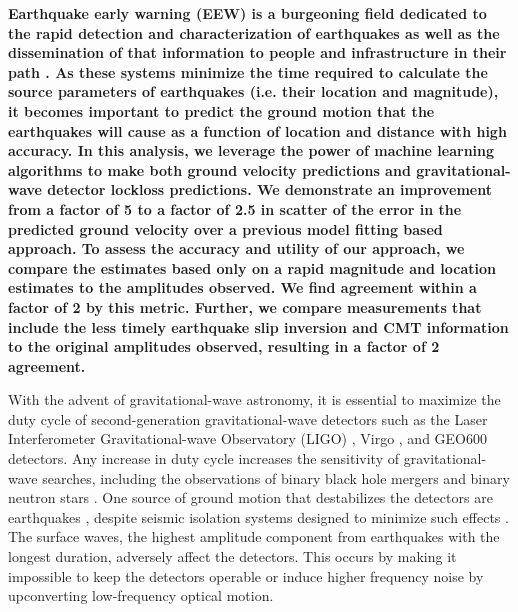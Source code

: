 \documentclass[preprint, aps, showpacs]{revtex4-1}
\begin{document}
\author{Hugh Radkins}

\author{Bas Swinkels}

\author{Keith Thorne}

\author{Jim Warner}

\maketitle

\textbf{Earthquake early warning (EEW) is a burgeoning field dedicated to the rapid detection and characterization of earthquakes as well as the dissemination of that information to people and infrastructure in their path \cite{Al2012,KuAl2013a,KuAl2013b,KuHe2014,CoLa2009a,CoLa2009b,BoAl2014,HoKa2008,HoEA2011c,StAl2016}.
As these systems minimize the time required to calculate the source parameters of earthquakes (i.e. their location and magnitude), it becomes important to predict the ground motion that the earthquakes will cause as a function of location and distance with high accuracy.
In this analysis, we leverage the power of machine learning algorithms to make both ground velocity predictions and gravitational-wave detector lockloss predictions. We demonstrate an improvement from a factor of 5 to a factor of 2.5  in scatter of the error in the predicted ground velocity over a previous model fitting based approach.
To assess the accuracy and utility of our approach, we compare the estimates based only on a rapid magnitude and location estimates to the amplitudes observed.
We find agreement within a factor of 2 by this metric.
Further, we compare measurements that include the less timely earthquake slip inversion and CMT information to the original amplitudes observed, resulting in a factor of 2 agreement.}

With the advent of gravitational-wave astronomy, it is essential to maximize the duty cycle of second-generation gravitational-wave detectors such as the Laser Interferometer Gravitational-wave Observatory (LIGO) \cite{aligo}, Virgo \cite{avirgo}, and GEO600 \cite{Gr2010} detectors.
Any increase in duty cycle increases the sensitivity of gravitational-wave searches, including the observations of binary black hole mergers \cite{AbEA2016a,AbEA2016e,AbEA2017a,AbEA2017c} and binary neutron stars \cite{AbEA2017b}.
One source of ground motion that destabilizes the detectors are earthquakes
\cite{CoSt2015,CoEa2017}, despite seismic isolation systems designed to minimize such effects \cite{AbAd2002,StAb2009,MaLa2015}.
The surface waves, the highest amplitude component from earthquakes with the longest duration, adversely affect the detectors. 
This occurs by making it impossible to keep the detectors operable or induce higher frequency noise by upconverting low-frequency optical motion.
\end{document}
